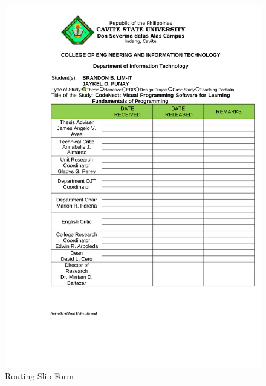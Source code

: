 \begin{figure}[H]
	 \centering
	 \includegraphics[width=\textwidth]{figures/4_routing_slip.png}
	 \caption[]{Routing Slip Form}
	 \label{fig:routing_slip}
\end{figure}
\clearpage
\null\vfill
